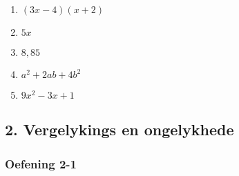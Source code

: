 {\begin{multicols}{3}
\begin{enumerate}[noitemsep, label=\textbf{\arabic*}. ]
\item $(3x - 4)(x + 2)$%
\item $5x$%
\item $8,85$ %
\item $a^2+2ab+4b^2$
\item $9x^2-3x+1$
\end{enumerate}

\end{multicols}


\subsection* {2. Vergelykings en ongelykhede}
\subsubsection*{Oefening 2-1} %

}
